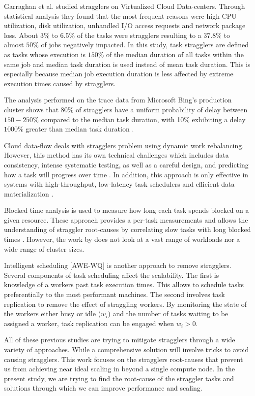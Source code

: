 Garraghan et al. \cite{Garraghan2016} studied stragglers on Virtualized Cloud Data-centers. 
Through statistical analysis they found that the most frequent reasons were high CPU utilization, disk utilization, unhandled I/O access requests and network package loss. 
About $3\%$ to $6.5\%$ of the tasks were stragglers resulting to a $37.8\%$ to almost $50\%$ of jobs negatively impacted. 
In this study, task stragglers are defined as tasks whose execution is $150\%$ of the median duration of all tasks within the same job and median task duration is used instead of mean task duration. 
This is especially because median job execution duration is less affected by extreme execution times caused by stragglers.  

The analysis performed on the trace data from Microsoft Bing's production cluster shows that $80\%$ of stragglers have a uniform probability of delay between $150-250\%$ 
compared to the median task duration, with 10\% exhibiting a delay $1000\%$ greater than median task duration \cite{Ananthanarayanan2010}.

Cloud data-flow deals with stragglers problem using dynamic work rebalancing. 
However, this method has its own technical challenges which includes data consistency, intense systematic testing, as well as a careful design, and predicting how a task will progress over time \cite{Schmidt2016}.
In addition, this approach is only effective in systems with high-throughput, low-latency task schedulers and efficient data materialization \cite{Rosen2012}.

Blocked time analysis is used to measure how long each task spends blocked on a given resource. 
These approach provides a per-task measurements and allows the understanding of straggler root-causes by correlating slow tasks with long blocked times \cite{Ousterhout2015}. 
However, the work by \cite{Ousterhout2015} does not look at a vast range of workloads nor a wide range of cluster sizes.

Intelligent scheduling [AWE-WQ] is another approach to remove stragglers. Several components of task scheduling affect the scalability.
The first is knowledge of a worker\textsc{}s past task execution times. This allows to schedule tasks preferentially to the most performant machines. 
The second involves task replication to remove the effect of straggling workers. 
By monitoring the state of the workers either busy or idle ($w_{i}$) and the number of tasks waiting to be assigned a worker, task replication can be engaged when $w_{i}>0$.

All of these previous studies are trying to mitigate stragglers through a wide variety of approaches.
While a comprehensive solution will involve tricks to avoid causing stragglers. 
This work focuses on the stragglers root-causes that prevent us from achieving near ideal scaling in  beyond a single compute node.
In the present study, we are trying to find the root-cause of the straggler tasks and solutions through which we can improve performance and scaling.

